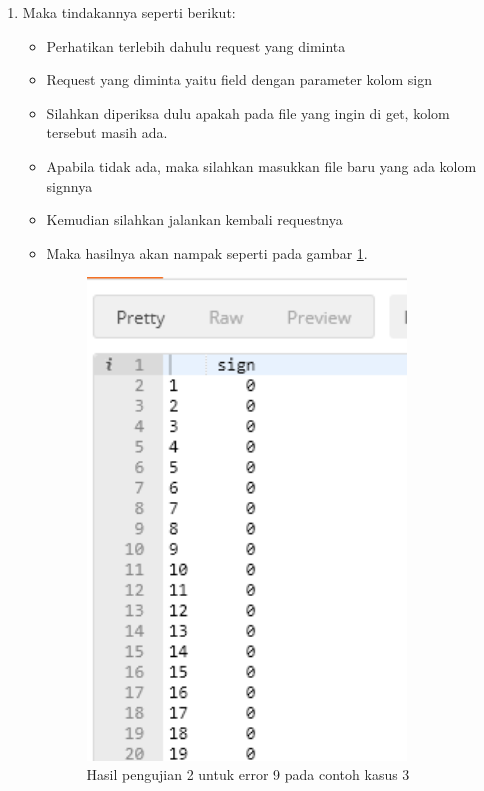 \begin{enumerate}
\item Maka tindakannya seperti berikut:
\begin{itemize}
\item Perhatikan terlebih dahulu request yang diminta
\item Request yang diminta yaitu field dengan parameter kolom sign
\item Silahkan diperiksa dulu apakah pada file yang ingin di get, kolom tersebut masih ada.
\item Apabila tidak ada, maka silahkan masukkan file baru yang ada kolom signnya
\item Kemudian silahkan jalankan kembali requestnya
\item Maka hasilnya akan nampak seperti pada gambar \ref{fig:huji2}.
\begin{figure}[!htbp]
	\centerline{\includegraphics[width=0.85\textwidth]{figures/10/huji2.PNG}}
	\caption{Hasil pengujian 2 untuk error 9 pada contoh kasus 3}
	\label{fig:huji2}
\end{figure}
\end{itemize}
\end{enumerate}

